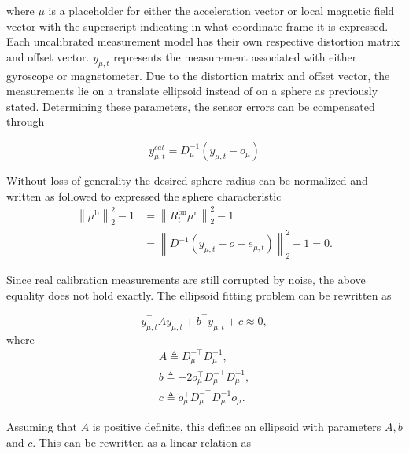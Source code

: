 where $\mu$ is a placeholder for either the acceleration vector or local magnetic field vector with the superscript indicating in what coordinate frame it is expressed. Each uncalibrated measurement model has their own respective distortion matrix and offset vector. $y_{\mu, t}$ represents the measurement associated with either gyroscope or magnetometer.
Due to the distortion matrix and offset vector, the measurements lie on a translate ellipsoid instead of on a sphere as previously stated. Determining these parameters, the sensor errors can be compensated through

\begin{equation}
	y_{\mu, t}^{cal}=D_\mu^{-1}\left(y_{\mu, t}-o_{\mu}\right)
\end{equation}

Without loss of generality the desired sphere radius can be normalized and written as followed to expressed the sphere characteristic
\begin{equation}
	\begin{aligned}
		\left\|\mu^{\mathrm{b}}\right\|_{2}^{2}-1 &=\left\|R_{t}^{\mathrm{bn}} \mu^{\mathrm{n}}\right\|_{2}^{2}-1 \\
		&=\left\|D^{-1}\left(y_{\mu, t}-o-e_{\mu, t}\right)\right\|_{2}^{2}-1=0.
	\end{aligned}
\end{equation}

Since real calibration measurements are still corrupted by noise, the above equality does not hold exactly. The ellipsoid fitting problem can be rewritten as

\begin{equation}
	\label{eq:calib_elipsoid}
	y_{\mu, t}^{\top} A y_{\mu, t}+b^{\top} y_{\mu, t}+c \approx 0,
\end{equation}
where
\begin{subequations}
	\label{eq:calib_elipsoid_components}
	\begin{align}
		A \triangleq D_\mu^{-\top} D_\mu^{-1}, \\
		b \triangleq-2 o_\mu^{\top} D_\mu^{-\top} D_\mu^{-1}, \\
		c \triangleq o_\mu^{\top} D_\mu^{-\top} D_\mu^{-1} o_\mu.
	\end{align}
\end{subequations}

Assuming that $A$ is positive definite, this defines an ellipsoid with parameters $A, b$ and $c$. This can be rewritten as a linear relation as


